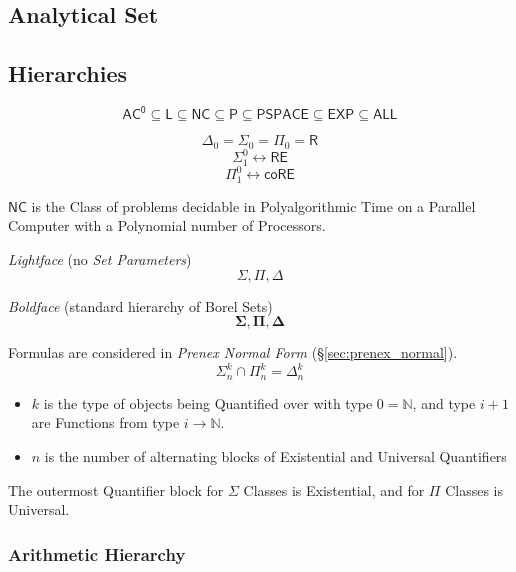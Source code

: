 \subsection{Analytical Set}\label{sec:analytical_set}



\subsection{Hierarchies}\label{sec:complexity_hierarchy}

\[
  \mathsf{AC^0} \subseteq \mathsf{L} \subseteq \mathsf{NC} \subseteq
  \mathsf{P} \subseteq \mathsf{PSPACE} \subseteq \mathsf{EXP}
  \subseteq \mathsf{ALL}
\]

\[
  \Delta_0 = \Sigma_0 = \Pi_0 = \mathsf{R}
\]\[
  \Sigma_1^0 \leftrightarrow \mathsf{RE}
\]\[
  \Pi_1^0 \leftrightarrow \mathsf{coRE}
\]

\emph{$\mathsf{NC}$} is the Class of problems decidable in
Polyalgorithmic Time on a Parallel Computer with a Polynomial number
of Processors.

\emph{Lightface} (no \emph{Set Parameters}) %
\[
  \Sigma, \Pi, \Delta
\]

\emph{Boldface} (standard hierarchy of Borel Sets)
\[
  \mathbf{\Sigma}, \mathbf{\Pi}, \mathbf{\Delta}
\]

Formulas are considered in \emph{Prenex Normal Form}
(\S\ref{sec:prenex_normal}).
\[
  \Sigma^k_n \cap \Pi^k_n = \Delta^k_n
\]
\begin{itemize}
  \item $k$ is the type of objects being Quantified over with type
    $0 = \mathbb{N}$, and type $i + 1$ are Functions from type $i
    \rightarrow \mathbb{N}$.
  \item $n$ is the number of alternating blocks of Existential and
    Universal Quantifiers
\end{itemize}
The outermost Quantifier block for $\Sigma$ Classes is Existential,
and for $\Pi$ Classes is Universal.



\subsubsection{Arithmetic Hierarchy}\label{sec:arithmetic_hierarchy}

